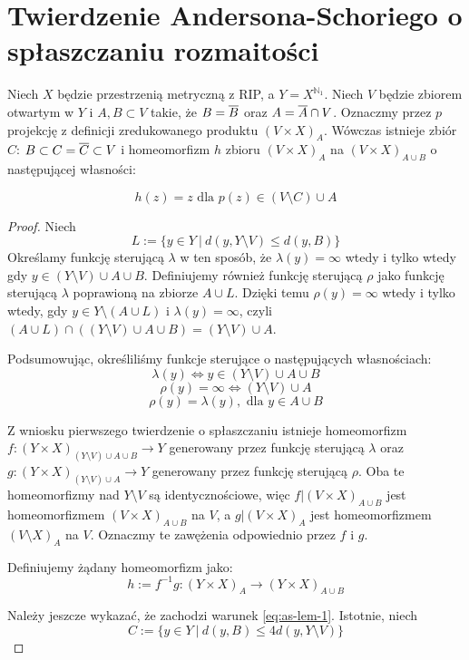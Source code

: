 \section{Twierdzenie Andersona-Schoriego o spłaszczaniu rozmaitości}

\begin{lem}
  Niech $X$ będzie przestrzenią metryczną z RIP, a $Y = X^{\mathbb{N}_1}$. Niech $V$ będzie zbiorem otwartym w $Y$ i $A, B \subset V$ takie, że $B = \overline{B}$ oraz $A = \overline{A} \cap V$. Oznaczmy przez $p$ projekcję z definicji zredukowanego produktu $(V \times X)_A$. Wówczas istnieje zbiór $C$: $B \subset C = \overline{C} \subset V$ i homeomorfizm $h$ zbioru $(V \times X)_A$ na $(V \times X)_{A \cup B}$ o następującej własności:
  
  \begin{equation} \label{eq:as-lem-1}
  h(z) = z \mbox{ dla } p(z) \in (V \setminus C) \cup A
  \end{equation}
  
  \begin{proof}
    Niech
    \[L := \{y \in Y\ |\ d(y, Y \setminus V) \leq d(y, B)\}\]
    Określamy funkcję sterującą $\lambda$ w ten sposób, że $\lambda(y) = \infty$ wtedy i tylko wtedy gdy $y \in (Y \setminus V) \cup A \cup B$.
    Definiujemy również funkcję sterującą $\rho$ jako funkcję sterującą $\lambda$ poprawioną na zbiorze $A \cup L$. Dzięki temu $\rho(y) = \infty$ wtedy i tylko wtedy, gdy $y \in Y \setminus (A \cup L)$ i $\lambda(y) = \infty$, czyli $(A \cup L) \cap ((Y \setminus V) \cup A \cup B) = (Y \setminus V) \cup A$.
    
    Podsumowując, określiliśmy funkcje sterujące o następujących własnościach:
    \[\lambda(y) \Leftrightarrow y \in (Y \setminus V) \cup A \cup B\]
    \[\rho(y) = \infty \Leftrightarrow (Y \setminus V) \cup A\]
    \[\rho(y) = \lambda(y), \mbox{ dla } y \in A \cup B\]
    
    Z wniosku pierwszego twierdzenie o spłaszczaniu istnieje homeomorfizm $f: (Y \times X)_{(Y \setminus V) \cup A \cup B} \rightarrow Y$ generowany przez funkcję sterującą $\lambda$ oraz $g: (Y \times X)_{(Y \setminus V) \cup A} \rightarrow Y$ generowany przez funkcję sterującą $\rho$. Oba te homeomorfizmy nad $Y \setminus V$ są identycznościowe, więc $f|(V \times X)_{A \cup B}$ jest homeomorfizmem $(V \times X)_{A \cup B}$ na $V$, a $g|(V \times X)_{A}$ jest homeomorfizmem $(V \setminus X)_{A}$ na $V$. Oznaczmy te zawężenia odpowiednio przez $f$ i $g$.
    
    Definiujemy żądany homeomorfizm jako:
    \[h := f^{-1} g: (Y \times X)_{A} \rightarrow (Y \times X)_{A \cup B}\]
    
    Należy jeszcze wykazać, że zachodzi warunek \eqref{eq:as-lem-1}. Istotnie, niech
    \[C := \{y \in Y\ |\ d(y,B) \leq 4 d(y, Y \setminus V)\}\]
  \end{proof}

\end{lem}
